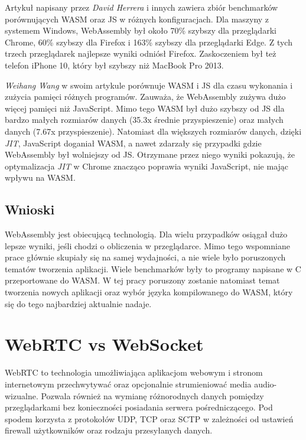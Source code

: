 \documentclass[language=polish,type=master]{aghmodern}
\begin{document}
Artykuł \cite{wasm_js_bench} napisany przez \emph{David Herrera} i innych zawiera zbiór benchmarków porównujących WASM oraz JS w różnych konfiguracjach.
Dla maszyny z systemem Windows, WebAssembly był około 70\% szybszy dla przeglądarki Chrome, 60\% szybszy dla Firefox i 163\% szybszy dla przeglądarki Edge.
Z tych trzech przeglądarek najlepsze wyniki odniósł Firefox.
Zaskoczeniem był też telefon iPhone 10, który był szybszy niż MacBook Pro 2013.

\emph{Weihang Wang} w swoim artykule \cite{wasm_js_bench2} porównuje WASM i JS dla czasu wykonania i zużycia pamięci różnych programów.
Zauważa, że WebAssembly zużywa dużo więcej pamięci niż JavaScript.
Mimo tego WASM był dużo szybszy od JS dla bardzo małych rozmiarów danych (35.3x średnie przyspieszenie) oraz małych danych (7.67x przyspieszenie).
Natomiast dla większych rozmiarów danych, dzięki \emph{JIT}\footnotemark{}, JavaScript doganiał WASM, a nawet zdarzały się przypadki gdzie WebAssembly był wolniejszy od JS.
Otrzymane przez niego wyniki pokazują, że optymalizacja \emph{JIT} w Chrome znacząco poprawia wyniki JavaScript, nie mając wpływu na WASM.

\subsection{Wnioski}
WebAssembly jest obiecującą technologią.
Dla wielu przypadków osiągał dużo lepsze wyniki, jeśli chodzi o obliczenia w przeglądarce.
Mimo tego wspomniane prace głównie skupiały się na samej wydajności, a nie wiele było poruszonych tematów tworzenia aplikacji.
Wiele benchmarków były to programy napisane w C przeportowane\footnotemark{} do WASM.
W tej pracy poruszony zostanie natomiast temat tworzenia nowych aplikacji oraz wybór języka kompilowanego do WASM, który się do tego najbardziej aktualnie nadaje.

\section{WebRTC vs WebSocket}
WebRTC to technologia umożliwiająca aplikacjom webowym i stronom internetowym przechwytywać oraz opcjonalnie strumieniować media audio-wizualne.
Pozwala również na wymianę różnorodnych danych pomiędzy przeglądarkami bez konieczności posiadania serwera pośredniczącego.
Pod spodem korzysta z protokołów UDP, TCP oraz SCTP w zależności od ustawień firewall użytkowników oraz rodzaju przesyłanych danych.
\end{document}
